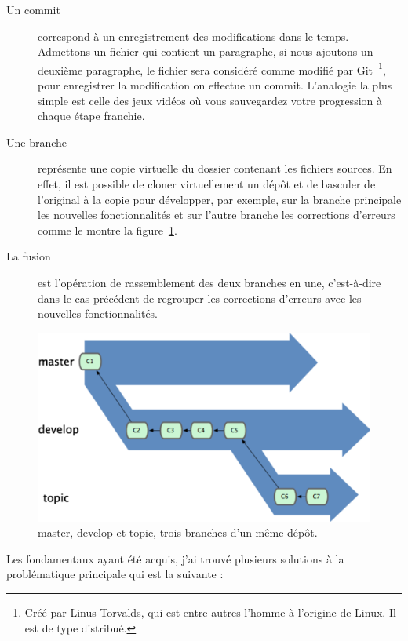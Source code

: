 \begin{description}
    \item[Un commit] correspond à un enregistrement des modifications dans le
    temps. Admettons un fichier qui contient un paragraphe, si nous ajoutons un
    deuxième paragraphe, le fichier sera considéré comme modifié par Git\,
    \footnote{Créé par Linus Torvalds, qui est entre autres l'homme à l'origine de
    Linux. Il est de type distribué.}, pour enregistrer la modification on effectue
    un commit. L'analogie la plus simple est celle des jeux vidéos où vous
    sauvegardez votre progression à chaque étape franchie.
    \item[Une branche] représente une \og copie virtuelle \fg{} du dossier
    contenant les fichiers sources. En effet, il est possible de cloner
    virtuellement un dépôt et de basculer de l'original à la copie pour développer,
    par exemple, sur la branche principale les nouvelles fonctionnalités et sur
    l'autre branche les corrections d'erreurs comme le montre la figure~\ref{branches}.
    \item[La fusion] est l'opération de rassemblement des deux branches en une,
    c'est-à-dire dans le cas précédent de regrouper les corrections d'erreurs avec
    les nouvelles fonctionnalités.
\end{description}

\begin{figure}[h]
\begin{center}
\includegraphics[scale=1]{images/branches.png}
\caption{master, develop et topic, trois branches d'un même dépôt.}
\label{branches}
\end{center}
\end{figure}

Les fondamentaux ayant été acquis, j'ai trouvé plusieurs solutions à la
problématique principale qui est la suivante :

